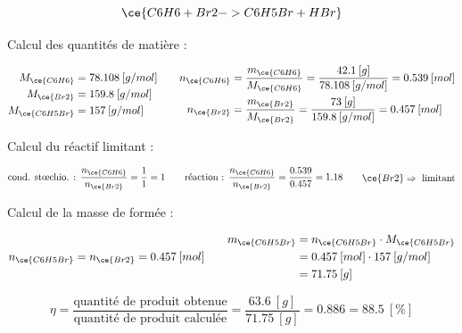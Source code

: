 \documentclass[
  11pt,
  french,
  a4paper,
  openany]{book}
\begin{document}
\begin{Answer}
\[ \ce{C6H6 + Br2 -> C6H5Br + HBr} \]

Calcul des quantités de matière :

\[ \begin{split}
        M_{\ce{C6H6}} &= 78.108\:[g/mol] \\
        M_{\ce{Br2}} &= 159.8\:[g/mol] \\
        M_{\ce{C6H5Br}} &= 157\:[g/mol]
    \end{split}
    \qquad
    \begin{split}
        n_{\ce{C6H6}} &= \frac{m_{\ce{C6H6}}}{M_{\ce{C6H6}}} = \frac{42.1\:[g]}{78.108\:[g/mol]} = 0.539\:[mol] \\
        n_{\ce{Br2}} &= \frac{m_{\ce{Br2}}}{M_{\ce{Br2}}} = \frac{73\:[g]}{159.8\:[g/mol]} = 0.457\:[mol]
    \end{split} \]

Calcul du réactif limitant :

\[ \begin{split}
            \text{cond. stœchio. : }\frac{n_{\ce{C6H6}}}{n_{\ce{Br2}}} = \frac{1}{1} = 1
        \end{split}
        \qquad
        \begin{split}
            \text{réaction : }\frac{n_{\ce{C6H6}}}{n_{\ce{Br2}}} = \frac{0.539}{0.457} = 1.18
        \end{split}
        \qquad
        \begin{split}
            \ce{Br2} \Rightarrow\text{ limitant}
        \end{split} \]

Calcul de la masse de  formée :

\[ \begin{split}
            n_{\ce{C6H5Br}} = n_{\ce{Br2}} = 0.457\:[mol]
        \end{split}
        \qquad
        \begin{split}
            m_{\ce{C6H5Br}} &= n_{\ce{C6H5Br}} \cdot M_{\ce{C6H5Br}} \\
            &= 0.457\:[mol] \cdot 157\:[g/mol]\\
            &= 71.75\:[g]
        \end{split} \]

\[ \eta = \frac{\text{quantité de produit obtenue}}{\text{quantité de produit calculée}} = \frac{63.6\:[g]}{71.75\:[g]} = 0.886 = 88.5\:[\%] \]

\end{Answer}
\end{document}
